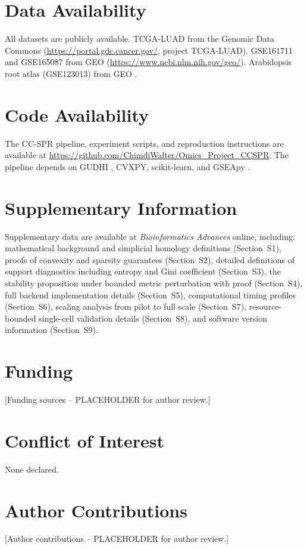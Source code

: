 \documentclass[12pt]{article}
\begin{document}
\section*{Data Availability}
All datasets are publicly available.
TCGA-LUAD from the Genomic Data Commons (\url{https://portal.gdc.cancer.gov/}, project TCGA-LUAD).
GSE161711 and GSE165087 from GEO (\url{https://www.ncbi.nlm.nih.gov/geo/}).
Arabidopsis root atlas (GSE123013) from GEO \citep{denyer2019}.

\section*{Code Availability}
The CC-SPR pipeline, experiment scripts, and reproduction instructions are available at \url{https://github.com/ChimdiWalter/Omics_Project_CCSPR}.
The pipeline depends on GUDHI \citep{gudhi2014}, CVXPY, scikit-learn, and GSEApy \citep{gseapy}.

\section*{Supplementary Information}
Supplementary data are available at \textit{Bioinformatics Advances} online, including:
mathematical background and simplicial homology definitions (Section~S1),
proofs of convexity and sparsity guarantees (Section~S2),
detailed definitions of support diagnostics including entropy and Gini coefficient (Section~S3),
the stability proposition under bounded metric perturbation with proof (Section~S4),
full backend implementation details (Section~S5),
computational timing profiles (Section~S6),
scaling analysis from pilot to full scale (Section~S7),
resource-bounded single-cell validation details (Section~S8),
and software version information (Section~S9).

\section*{Funding}
[Funding sources -- PLACEHOLDER for author review.]

\section*{Conflict of Interest}
None declared.

\section*{Author Contributions}
[Author contributions -- PLACEHOLDER for author review.]
\end{document}
